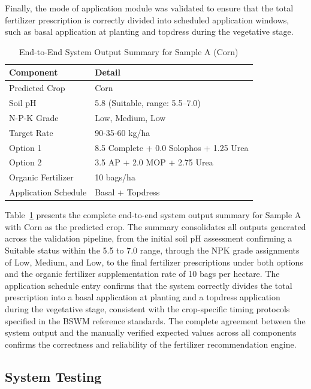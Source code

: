 {	Finally, the mode of application module was validated to ensure that the total fertilizer prescription is correctly divided into scheduled application windows, such as basal application at planting and topdress during the vegetative stage.
	
	\begin{table}[H]
		\centering
		\caption{End-to-End System Output Summary for Sample A (Corn)}
		\label{tab:final_output}
		\renewcommand{\arraystretch}{1.2}
		\begin{tabular}{ll}
			\toprule
			Component & Detail \\
			\midrule
			Predicted Crop & Corn \\
			Soil pH & 5.8 (Suitable, range: 5.5--7.0) \\
			N-P-K Grade & Low, Medium, Low \\
			Target Rate & 90-35-60 kg/ha \\
			Option 1 & 8.5 Complete + 0.0 Solophos + 1.25 Urea \\
			Option 2 & 3.5 AP + 2.0 MOP + 2.75 Urea \\
			Organic Fertilizer & 10 bags/ha \\
			Application Schedule & Basal + Topdress \\
			\bottomrule
		\end{tabular}
	\end{table}
	
	Table~\ref{tab:final_output} presents the complete end-to-end system output summary for Sample A with Corn as the predicted crop. The summary consolidates all outputs generated across the validation pipeline, from the initial soil pH assessment confirming a Suitable status within the 5.5 to 7.0 range, through the NPK grade assignments of Low, Medium, and Low, to the final fertilizer prescriptions under both options and the organic fertilizer supplementation rate of 10 bags per hectare. The application schedule entry confirms that the system correctly divides the total prescription into a basal application at planting and a topdress application during the vegetative stage, consistent with the crop-specific timing protocols specified in the BSWM reference standards. The complete agreement between the system output and the manually verified expected values across all components confirms the correctness and reliability of the fertilizer recommendation engine.
	
	\subsection{System Testing}
	
}
